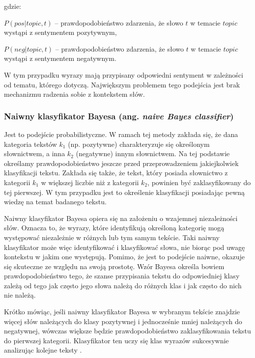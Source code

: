 gdzie:

$P(pos | topic, t)$ -- prawdopodobieństwo zdarzenia, że słowo $t$ w temacie 
$topic$ wystąpi z sentymentem pozytywnym,

$P(neg | topic, t)$ -- prawdopodobieństwo zdarzenia, że słowo $t$ w temacie
$topic$ wystąpi z sentymentem negatywnym.

\bigskip


W tym przypadku wyrazy mają przypisany odpowiedni sentyment w zależności od
tematu, którego dotyczą. Największym problemem tego podejścia jest brak
mechanizmu radzenia sobie z kontekstem słów.

\subsubsection{Naiwny klasyfikator Bayesa (ang. \textit{naive Bayes classifier})}
Jest to podejście probabilistyczne. W ramach tej metody zakłada się, że dana kategoria
tekstów $k_1$ (np. pozytywne) charakteryzuje się określonym słownictwem, 
a inna $k_2$ (negatywne) innym słownictwem. 
Na tej podstawie określamy prawdopodobieństwo jeszcze przed przeprowadzeniem
jakiejkolwiek klasyfikacji tekstu. Zakłada się także, że tekst, który posiada
słownictwo z kategorii $k_1$ w większej liczbie niż z kategorii $k_2$, powinien
być zaklasyfikowany do tej pierwszej. 
W tym przypadku jest to określenie klasyfikacji posiadając pewną wiedzę na temat
badanego tekstu.

Naiwny klasyfikator Bayesa opiera się na założeniu o wzajemnej niezależności
słów. Oznacza to, że wyrazy, które identyfikują określoną kategorię mogą występować
niezależnie w różnych lub tym samym tekście. Taki naiwny klasyfikator może więc 
identyfikować i klasyfikować słowa, nie biorąc pod uwagę kontekstu w jakim one
występują. Pomimo, że jest to podejście naiwne, okazuje się skuteczne ze względu
na swoją prostotę. Wzór Bayesa określa bowiem prawdopodobieństwo tego, że szanse
przypisania tekstu do odpowiedniej klasy zależą od tego jak często jego słowa
należą do różnych klas i jak często do nich nie należą.

Krótko mówiąc, jeśli naiwny klasyfikator Bayesa w wybranym tekście znajdzie więcej
słów należących do klasy pozytywnej i jednocześnie mniej należących do negatywnej,
wówczas większe będzie prawdopodobieństwo zaklasyfikowania tekstu do pierwszej
kategorii. Klasyfikator ten uczy się klas wyrazów sukcesywnie analizując
kolejne teksty \cite{tomanekSentyment}.



